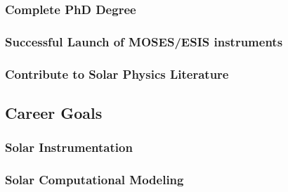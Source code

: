 \documentclass[10pt,letterpaper]{article}
\begin{document}
			\subsubsection{Complete PhD Degree}
			\subsubsection{Successful Launch of MOSES/ESIS instruments}
			\subsubsection{Contribute to Solar Physics Literature}
		\subsection{Career Goals}
			\subsubsection{Solar Instrumentation}
			\subsubsection{Solar Computational Modeling}
		
\end{document}
